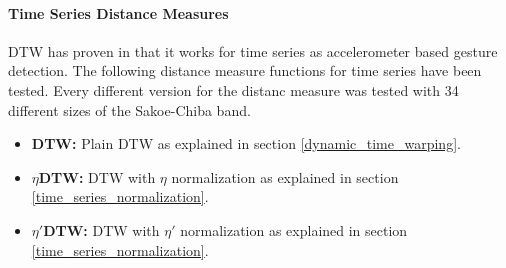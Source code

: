 \paragraph{Time Series Distance Measures} \label{time_series_distance_measures}
DTW has proven in \cite{liu2009uwave} that it works for time series as accelerometer based gesture detection. The
following distance measure functions for time series have been tested. Every different version for the distanc measure
was tested with 34 different sizes of the Sakoe-Chiba band.

\begin{itemize}
    \item \textbf{DTW:} Plain DTW as explained in section \ref{dynamic_time_warping}.
    \item \textbf{$\eta$DTW:} DTW with $\eta$ normalization as explained in section \ref{time_series_normalization}.
    \item \textbf{$\eta '$DTW:} DTW with $\eta '$ normalization as explained in section \ref{time_series_normalization}.
\end{itemize}
